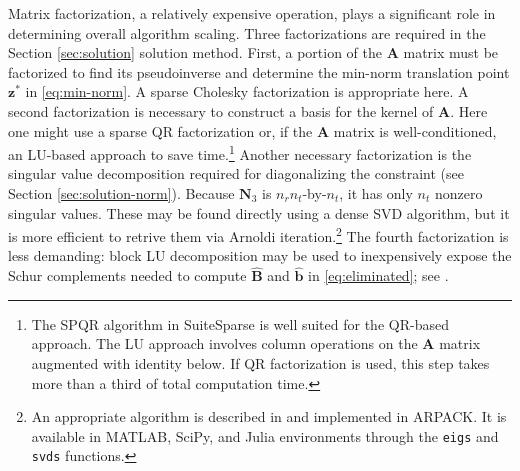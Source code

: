 \documentclass[journal,twoside]{IEEEtran}
\renewcommand{\vec}[1]{\mathbf{#1}}
\begin{document}
Matrix factorization, a relatively expensive operation, plays a significant role in determining overall algorithm scaling. Three factorizations are required in the Section \ref{sec:solution} solution method. First, a portion of the $\mathbf{A}$ matrix must be factorized to find its pseudoinverse and determine the min-norm translation point $\vec{z}^*$ in \eqref{eq:min-norm}. A sparse Cholesky factorization is appropriate here. A second factorization is necessary to construct a basis for the kernel of $\mathbf{A}$. Here one might use a sparse QR factorization or, if the $\mathbf{A}$ matrix is well-conditioned, an LU-based approach to save time.\footnote{The SPQR algorithm in SuiteSparse \cite{foster2011} is well suited for the QR-based approach. The LU approach involves column operations on the $\mathbf{A}$ matrix augmented with identity below. If QR factorization is used, this step takes more than a third of total computation time.}
Another necessary factorization is the singular value decomposition required for diagonalizing the constraint (see Section \ref{sec:solution-norm}). Because $\mathbf{N}_3$ is $n_rn_t$-by-$n_t$, it has only $n_t$ nonzero singular values. These may be found directly using a dense SVD algorithm, but it is more efficient to retrive them via Arnoldi iteration.\footnote{An appropriate algorithm is described in \cite{lehoucq1996} and implemented in ARPACK. It is available in MATLAB, SciPy, and Julia environments through the \texttt{eigs} and \texttt{svds} functions.} The fourth factorization is less demanding: block LU decomposition may be used to inexpensively expose the Schur complements needed to compute $\hat{\mathbf{B}}$ and $\hat{\mathbf{b}}$ in \eqref{eq:eliminated}; see \cite{zhang2006}.
\end{document}
